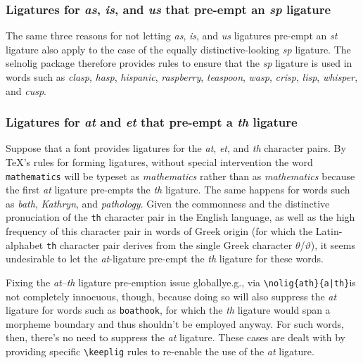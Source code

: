 \documentclass[11pt]{article}
\newcommand{\pkg}[1]{\textsf{#1}}
\newcommand{\opt}[1]{\texttt{#1}}
\newcommand{\cmmd}[1]{\texttt{\textbackslash #1}}
\begin{document}
\subsubsection*{Ligatures for \emph{as}, \emph{is}, and \emph{us} that pre-empt an \emph{sp} ligature}

The same three reasons for not letting \emph{as}, \emph{is}, and \emph{us} ligatures pre-empt an \emph{st} ligature also apply to the case of the equally distinctive-looking \emph{sp} ligature. The \pkg{selnolig} package therefore provides rules to ensure that the \emph{sp} ligature is used in words such as \emph{clasp}, \emph{hasp}, \emph{hispanic}, \emph{raspberry}, \emph{teaspoon}, \emph{wasp}, \emph{crisp}, \emph{lisp}, \emph{whisper}, and \emph{cusp}. 



\subsubsection*{Ligatures for \emph{at} and \emph{et} that pre-empt a \emph{th} ligature}

Suppose that a font provides ligatures for the \emph{at}, \emph{et}, and \emph{th} character pairs. By \TeX's rules for forming ligatures, without special intervention the word \opt{mathematics} will be typeset as \emph{m\mbox{at}hematics} rather than as \emph{mathematics} because the first \emph{at} ligature pre-empts the \emph{th} ligature. The same happens for words such as \emph{b\mbox{at}h}, \emph{K\mbox{at}hryn}, and \emph{p\mbox{at}hology}.
Given the commonness and the distinctive pronuciation of the \opt{th} character pair in the English language, as well as the high frequency of this character pair in words of Greek origin (for which the Latin-alphabet \opt{th} character pair derives from the single Greek character $\theta$/$\vartheta$), it seems undesirable to let the \emph{at}-ligature pre-empt the \emph{th} ligature for these words. 

Fixing the \emph{at}--\emph{th} ligature pre-emption issue globally\textemdash e.g., via \Verb+\nolig{ath}{a|th}+\textemdash is not completely innocuous, though, because doing so will also suppress the \emph{at} ligature for words such as \opt{boathook}, for which the \emph{th} ligature would span a morpheme boundary and thus shouldn't be employed anyway. For such words, then, there's no need to suppress the \emph{at} ligature. These cases are dealt with by providing specific \cmmd{keeplig} rules to re-enable the use of the \emph{at} ligature.
\end{document}
